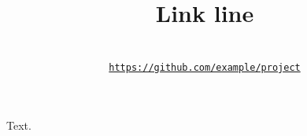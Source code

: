 \documentclass[conference]{IEEEtran}
\begin{document}
\title{Link line}
\author{
\\
{\texttt{\url{https://github.com/example/project}}}}
\maketitle
Text.
\end{document}
